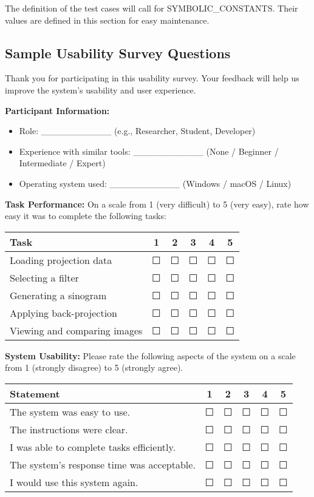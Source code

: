 \documentclass[12pt, titlepage]{article}
\begin{document}
The definition of the test cases will call for SYMBOLIC\_CONSTANTS.
Their values are defined in this section for easy maintenance.

\subsection{Sample Usability Survey Questions}\label{survey}
Thank you for participating in this usability survey. Your feedback will help us improve the system’s usability and user experience.

\textbf{Participant Information:}
\begin{itemize}
    \item Role: \_\_\_\_\_\_\_\_\_\_\_ (e.g., Researcher, Student, Developer)
    \item Experience with similar tools: \_\_\_\_\_\_\_\_\_\_\_ (None / Beginner / Intermediate / Expert)
    \item Operating system used: \_\_\_\_\_\_\_\_\_\_\_ (Windows / macOS / Linux)
\end{itemize}

\textbf{Task Performance:}
On a scale from 1 (very difficult) to 5 (very easy), rate how easy it was to complete the following tasks:
\begin{center}
    \begin{tabular}{|l|c|c|c|c|c|}
        \hline
        \textbf{Task} & 1 & 2 & 3 & 4 & 5 \\
        \hline
        Loading projection data & ☐ & ☐ & ☐ & ☐ & ☐ \\
        Selecting a filter & ☐ & ☐ & ☐ & ☐ & ☐ \\
        Generating a sinogram & ☐ & ☐ & ☐ & ☐ & ☐ \\
        Applying back-projection & ☐ & ☐ & ☐ & ☐ & ☐ \\
        Viewing and comparing images & ☐ & ☐ & ☐ & ☐ & ☐ \\
        \hline
    \end{tabular}
\end{center}

\textbf{System Usability:}
Please rate the following aspects of the system on a scale from 1 (strongly disagree) to 5 (strongly agree).
\begin{center}
    \begin{tabular}{|l|c|c|c|c|c|}
        \hline
        \textbf{Statement} & 1 & 2 & 3 & 4 & 5 \\
        \hline
        The system was easy to use. & ☐ & ☐ & ☐ & ☐ & ☐ \\
        The instructions were clear. & ☐ & ☐ & ☐ & ☐ & ☐ \\
        I was able to complete tasks efficiently. & ☐ & ☐ & ☐ & ☐ & ☐ \\
        The system's response time was acceptable. & ☐ & ☐ & ☐ & ☐ & ☐ \\
        I would use this system again. & ☐ & ☐ & ☐ & ☐ & ☐ \\
        \hline
    \end{tabular}
\end{center}
\end{document}
